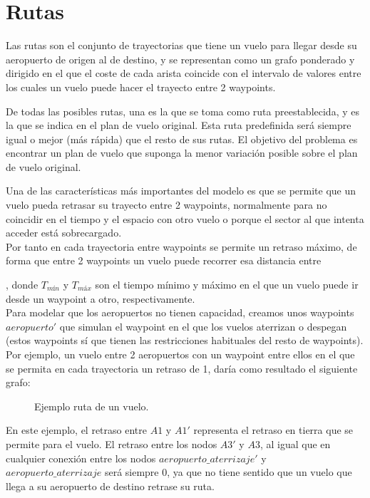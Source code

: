 \section{Rutas}
Las rutas son el conjunto de trayectorias que tiene un vuelo para llegar desde su aeropuerto de origen al de destino, y se representan como un grafo ponderado y dirigido en el que el coste de cada arista coincide con el intervalo de valores entre los cuales un vuelo puede hacer el trayecto entre 2 waypoints.

De todas las posibles rutas, una es la que se toma como ruta preestablecida, y es la que se indica en el plan de vuelo original. Esta ruta predefinida será siempre igual o mejor (más rápida) que el resto de sus rutas. El objetivo del problema es encontrar un plan de vuelo que suponga la menor variación posible sobre el plan de vuelo original.

Una de las características más importantes del modelo es que se permite que un vuelo pueda retrasar su trayecto entre 2 waypoints, normalmente para no coincidir en el tiempo y el espacio con otro vuelo o porque el sector al que intenta acceder está sobrecargado.\\

Por tanto en cada trayectoria entre waypoints se permite un retraso máximo, de forma que entre 2 waypoints un vuelo puede recorrer esa distancia entre
\begin{equation}
[T_{mín} , T_{máx}]
\end{equation}

\noindent, donde $T_{mín}$ y $T_{máx}$ son el tiempo mínimo y máximo en el que un vuelo puede ir desde un waypoint a otro, respectivamente.\\

Para modelar que los aeropuertos no tienen capacidad, creamos unos waypoints $aeropuerto'$ que simulan el waypoint en el que los vuelos aterrizan o despegan (estos waypoints sí que tienen las restricciones habituales del resto de waypoints). Por ejemplo, un vuelo entre 2 aeropuertos con un waypoint entre ellos en el que se permita en cada trayectoria un retraso de 1, daría como resultado el siguiente grafo:
\begin{figure}[h]
	\centering
	
	\caption{Ejemplo ruta de un vuelo.}
	\label{fig: Ejemplo ruta de un vuelo}
\end{figure}

En este ejemplo, el retraso entre $A1$ y $A1'$ representa el retraso en tierra que se permite para el vuelo. El retraso entre los nodos $A3'$ y $A3$, al igual que en cualquier conexión entre los nodos $aeropuerto\_aterrizaje'$ y $aeropuerto\_aterrizaje$ será siempre 0, ya que no tiene sentido que un vuelo que llega a su aeropuerto de destino retrase su ruta.


